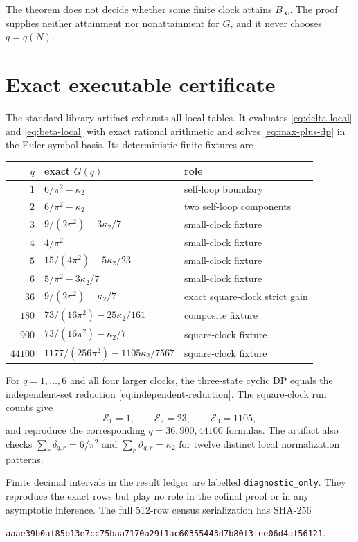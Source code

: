 \documentclass[11pt]{article}
\theoremstyle{definition}
\theoremstyle{remark}
\newcommand{\dd}{\delta}
\newcommand{\thh}{\vartheta}
\newcommand{\kap}{\kappa_2}
\newcommand{\Ecal}{\mathcal E}
\begin{document}
The theorem does not decide whether some finite clock attains
$B_\infty$.  The proof supplies neither attainment nor nonattainment for
$G$, and it never chooses $q=q(N)$.

\section{Exact executable certificate}

The standard-library artifact exhausts all local tables.  It evaluates
\eqref{eq:delta-local} and \eqref{eq:beta-local} with exact rational
arithmetic and solves \eqref{eq:max-plus-dp} in the
Euler-symbol basis.  Its deterministic finite fixtures are
\begin{center}
\begin{tabular}{rll}
\toprule
$q$&exact $G(q)$&role\\
\midrule
$1$&$6/\pi^2-\kap$&self-loop boundary\\
$2$&$6/\pi^2-\kap$&two self-loop components\\
$3$&$9/(2\pi^2)-3\kap/7$&small-clock fixture\\
$4$&$4/\pi^2$&small-clock fixture\\
$5$&$15/(4\pi^2)-5\kap/23$&small-clock fixture\\
$6$&$5/\pi^2-3\kap/7$&small-clock fixture\\
$36$&$9/(2\pi^2)-\kap/7$&exact square-clock strict gain\\
$180$&$73/(16\pi^2)-25\kap/161$&composite fixture\\
$900$&$73/(16\pi^2)-\kap/7$&square-clock fixture\\
$44100$&$1177/(256\pi^2)-1105\kap/7567$&square-clock fixture\\
\bottomrule
\end{tabular}
\end{center}
For $q=1,\ldots,6$ and all four larger clocks, the three-state cyclic DP
equals the independent-set reduction \eqref{eq:independent-reduction}.
The square-clock run counts give
\[
        \Ecal_1=1,\qquad \Ecal_2=23,\qquad \Ecal_3=1105,
\]
and reproduce the corresponding $q=36,900,44100$ formulas.  The artifact
also checks $\sum_r\dd_{q,r}=6/\pi^2$ and
$\sum_r\thh_{q,r}=\kap$ for twelve distinct local normalization patterns.

Finite decimal intervals in the result ledger are labelled
\texttt{diagnostic\_only}.  They reproduce the exact rows but play no role
in the cofinal proof or in any asymptotic inference.  The full 512-row
census serialization has SHA-256
\begin{center}
\texttt{aaae39b0af85b13e7cc75baa7170a29f1ac60355443d7b80f3fee06d4af56121}.
\end{center}
\end{document}
